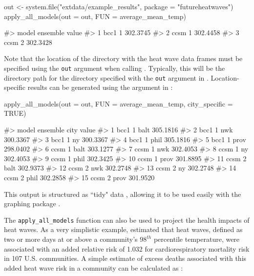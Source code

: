 \begin{Schunk}
\begin{Sinput}
out <- system.file("extdata/example_results", package = "futureheatwaves")
apply_all_models(out = out, FUN = average_mean_temp)
\end{Sinput}
\begin{Soutput}
#>   model ensemble    value
#> 1  bcc1        1 302.3745
#> 2  ccsm        1 302.4458
#> 3  ccsm        2 302.3428
\end{Soutput}
\end{Schunk}

Note that the location of the directory with the heat wave data frames
must be specified using the \texttt{out} argument when calling
. Typically, this will be the directory path
for the directory specified with the \texttt{out} argument in
. Location-specific results can be generated using
the  argument in :

\begin{Schunk}
\begin{Sinput}
apply_all_models(out = out, FUN = average_mean_temp, city_specific = TRUE)
\end{Sinput}
\begin{Soutput}
#>    model ensemble city    value
#> 1   bcc1        1 balt 305.1816
#> 2   bcc1        1  nwk 300.3367
#> 3   bcc1        1   ny 300.3367
#> 4   bcc1        1 phil 305.1816
#> 5   bcc1        1 prov 298.0402
#> 6   ccsm        1 balt 303.1277
#> 7   ccsm        1  nwk 302.4053
#> 8   ccsm        1   ny 302.4053
#> 9   ccsm        1 phil 302.3425
#> 10  ccsm        1 prov 301.8895
#> 11  ccsm        2 balt 302.9373
#> 12  ccsm        2  nwk 302.2748
#> 13  ccsm        2   ny 302.2748
#> 14  ccsm        2 phil 302.2858
#> 15  ccsm        2 prov 301.9520
\end{Soutput}
\end{Schunk}

This output is structured as ``tidy" data \citep{wickham2014tidy},
allowing it to be used easily with the graphing package
 \citep{ggplot2}.

The \texttt{apply\_all\_models} function can also be used to project the
health impacts of heat waves. As a very simplistic example,
\citet{anderson2009weather} estimated that heat waves, defined as two or
more days at or above a community's \(98^{th}\) percentile temperature,
were associated with an added relative risk of 1.032 for
cardiorespiratory mortality risk in 107 U.S. communities. A simple
estimate of excess deaths associated with this added heat wave risk in a
community can be calculated as \citep{peng2011toward}:

